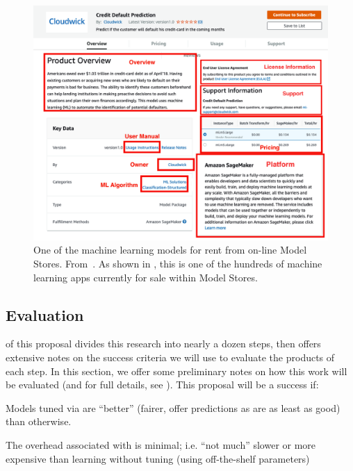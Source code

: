 \begin{figure}
\begin{center}
\includegraphics[width=6in]{fig/store1.png}
 \end{center}
  \caption{One of the machine learning models
 for rent from on-line Model Stores. 
  From~\cite{xiu2019exploratory}.
  As shown in , this is one
  of the hundreds of machine learning
  apps currently for sale within Model Stores.}\label{fig:one}
  \end{figure}

\subsection{Evaluation}\label{evaluation}

\noindent
{} of this proposal divides this research into nearly a dozen steps,
then offers extensive notes on the success criteria we will use to evaluate the products of each step. 
In this section, we offer some preliminary notes on how this work will be evaluated (and for full
details, see ).
This proposal will be  a success if:
\bi
\item 
 Models tuned via {\IT}  are ``better'' (fairer, offer predictions as 
 are as least as good)
  than otherwise.
  \item
The overhead associated with {\IT} is minimal; i.e. ``not much'' 
slower or more expensive   than learning without tuning (using off-the-shelf parameters)
\ei

